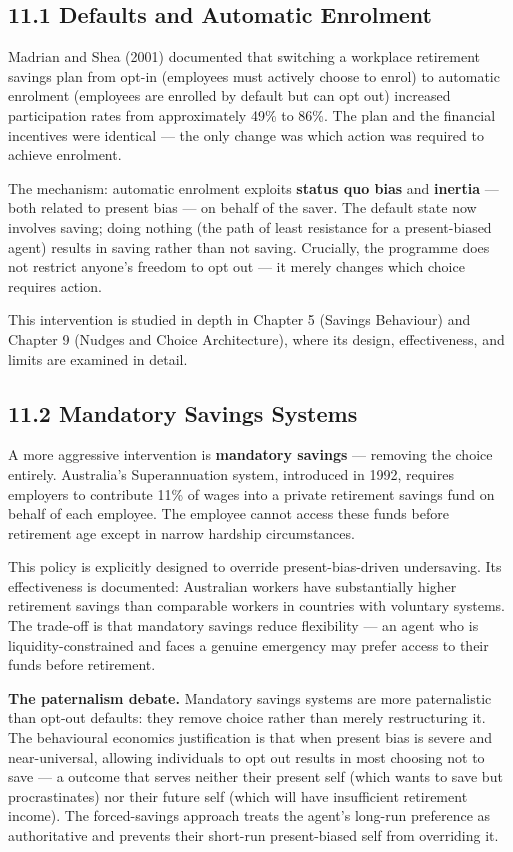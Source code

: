 \documentclass[12pt, letterpaper]{article}
\begin{document}
\subsection{11.1 Defaults and Automatic Enrolment}


Madrian and Shea (2001) documented that switching a workplace retirement savings plan from opt-in (employees must actively choose to enrol) to automatic enrolment (employees are enrolled by default but can opt out) increased participation rates from approximately 49\% to 86\%. The plan and the financial incentives were identical --- the only change was which action was required to achieve enrolment.

The mechanism: automatic enrolment exploits \textbf{status quo bias} and \textbf{inertia} --- both related to present bias --- on behalf of the saver. The default state now involves saving; doing nothing (the path of least resistance for a present-biased agent) results in saving rather than not saving. Crucially, the programme does not restrict anyone's freedom to opt out --- it merely changes which choice requires action.

This intervention is studied in depth in Chapter 5 (Savings Behaviour) and Chapter 9 (Nudges and Choice Architecture), where its design, effectiveness, and limits are examined in detail.


\subsection{11.2 Mandatory Savings Systems}


A more aggressive intervention is \textbf{mandatory savings} --- removing the choice entirely. Australia's Superannuation system, introduced in 1992, requires employers to contribute 11\% of wages into a private retirement savings fund on behalf of each employee. The employee cannot access these funds before retirement age except in narrow hardship circumstances.

This policy is explicitly designed to override present-bias-driven undersaving. Its effectiveness is documented: Australian workers have substantially higher retirement savings than comparable workers in countries with voluntary systems. The trade-off is that mandatory savings reduce flexibility --- an agent who is liquidity-constrained and faces a genuine emergency may prefer access to their funds before retirement.

\textbf{The paternalism debate.} Mandatory savings systems are more paternalistic than opt-out defaults: they remove choice rather than merely restructuring it. The behavioural economics justification is that when present bias is severe and near-universal, allowing individuals to opt out results in most choosing not to save --- a outcome that serves neither their present self (which wants to save but procrastinates) nor their future self (which will have insufficient retirement income). The forced-savings approach treats the agent's long-run preference as authoritative and prevents their short-run present-biased self from overriding it.
\end{document}
